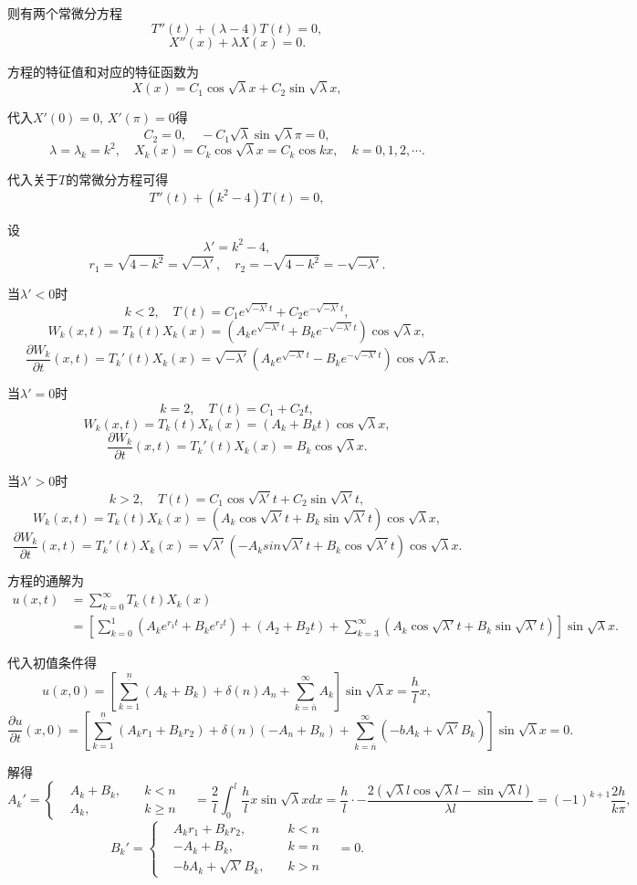 \documentclass[11pt,a4paper]{article}
\begin{document}
则有两个常微分方程
$$T''(t)+(\lambda-4)T(t)=0,$$
$$X''(x)+\lambda X(x)=0.$$

方程的特征值和对应的特征函数为
$$X(x)=C_1\cos\sqrt{\lambda}x+C_2\sin\sqrt{\lambda}x,$$

代入$X'(0)=0$, $X'(\pi)=0$得
$$C_2=0,\quad -C_1\sqrt{\lambda}\sin\sqrt{\lambda}\pi=0,$$
$$\lambda=\lambda_k=k^2,\quad X_k(x)=C_k\cos\sqrt{\lambda}x=C_k\cos kx,\quad k=0,1,2,\cdots.$$

代入关于$T$的常微分方程可得
$$T''(t)+(k^2-4)T(t)=0,$$

设$$\lambda'=k^2-4,$$
$$r_1=\sqrt{4-k^2}=\sqrt{-\lambda'},\quad r_2=-\sqrt{4-k^2}=-\sqrt{-\lambda'}.$$

当$\lambda'<0$时
$$k<2,\quad T(t)=C_1e^{\sqrt{-\lambda'}t}+C_2e^{-\sqrt{-\lambda'}t},$$
$$W_k(x,t)=T_k(t)X_k(x)=(A_ke^{\sqrt{-\lambda'}t}+B_ke^{-\sqrt{-\lambda'}t})\cos\sqrt{\lambda}x,$$
$$\frac{\partial W_k}{\partial t}(x,t)=T_k'(t)X_k(x)=\sqrt{-\lambda'}(A_ke^{\sqrt{-\lambda'}t}-B_ke^{-\sqrt{-\lambda'}t})\cos\sqrt{\lambda}x.$$

当$\lambda'=0$时
$$k=2,\quad T(t)=C_1+C_2t,$$
$$W_k(x,t)=T_k(t)X_k(x)=(A_k+B_kt)\cos\sqrt{\lambda}x,$$
$$\frac{\partial W_k}{\partial t}(x,t)=T_k'(t)X_k(x)=B_k\cos\sqrt{\lambda}x.$$

当$\lambda'>0$时
$$k>2,\quad T(t)=C_1\cos\sqrt{\lambda'}t+C_2\sin\sqrt{\lambda'}t,$$
$$W_k(x,t)=T_k(t)X_k(x)=(A_k\cos\sqrt{\lambda'}t+B_k\sin\sqrt{\lambda'}t)\cos\sqrt{\lambda}x,$$
$$\frac{\partial W_k}{\partial t}(x,t)=T_k'(t)X_k(x)=\sqrt{\lambda'}(-A_ksin\sqrt{\lambda'}t+B_k\cos\sqrt{\lambda'}t)\cos\sqrt{\lambda}x.$$

方程的通解为
\begin{align*}
  u(x,t)&=\sum_{k=0}^\infty T_k(t)X_k(x)\\
  &=\left[\sum_{k=0}^1(A_ke^{r_1t}+B_ke^{r_2t})+(A_2+B_2t)+\sum_{k=3}^\infty (A_k\cos\sqrt{\lambda'}t+B_k\sin\sqrt{\lambda'}t)\right]\sin\sqrt{\lambda}x.
\end{align*}

代入初值条件得
$$u(x,0)=\left[\sum_{k=1}^{\underline{n}}(A_k+B_k)+\delta(n)A_n+\sum_{k=\overline{n}}^\infty A_k\right]\sin\sqrt{\lambda}x=\frac{h}{l}x,$$
$$\frac{\partial u}{\partial t}(x,0)=\left[\sum_{k=1}^{\underline{n}}(A_kr_1+B_kr_2)+\delta(n)(-A_n+B_n)+\sum_{k=\overline{n}}^\infty(-bA_k+\sqrt{\lambda'}B_k)\right]\sin\sqrt{\lambda}x=0.$$

解得
$$A_k'=\left\{\begin{aligned}&A_k+B_k,&\quad k<n\\&A_k,&\quad k\geqslant n\end{aligned}\right.
\quad=\frac{2}{l}\int_0^l\frac{h}{l}x\sin\sqrt{\lambda}xdx=\frac{h}{l}\cdot-\frac{2(\sqrt{\lambda}l\cos\sqrt{\lambda}l-\sin\sqrt{\lambda}l)}{\lambda l}=(-1)^{k+1}\frac{2h}{k\pi},$$
$$B_k'=\left\{\begin{aligned}&A_kr_1+B_kr_2,&\quad k<n\\&-A_k+B_k,&\quad k=n\\&-bA_k+\sqrt{\lambda'}B_k,&\quad k>n\end{aligned}\right.\quad=0.$$
\end{document}
